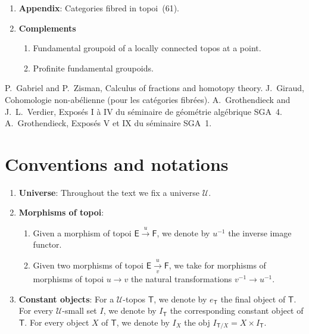 \documentclass[10pt,oneside]{amsart}
\newcommand{\oldpage}[1]{\marginnote{\textbf{#1}}}
\newcommand{\cal}{\mathcal}
\newcommand{\cat}{\mathsf}
\begin{document}
\begin{enumerate}[label=\arabic*.]
    I removed it in the corollary of Proposition~4.6.2, which directly describes the locally constant objects of the inductive limit.
    The advantage of the form (4.5) is to allow explicit calculations, which are developed in the points 4.6.3 and 4.6.7.
  \item[A.] \textbf{Appendix}: Categories fibred in topoi~(61).
  \item \textbf{Complements}
    \begin{enumerate}[label=5.\arabic*.]
      \item Fundamental groupoid of a locally connected topos at a point.
      \item Profinite fundamental groupoids.
    \end{enumerate}
\end{enumerate}

\begin{thebibliography}{4}
   P.~Gabriel and P.~Zisman, {Calculus of fractions and homotopy theory}.
   J.~Giraud, {Cohomologie non-ab\'elienne (pour les cat\'egories fibr\'ees)}.
   A.~Grothendieck and J.~L.~Verdier, {Expos\'es I \`a IV du s\'eminaire de g\'eom\'etrie alg\'ebrique SGA~4}.
   A.~Grothendieck, {Expos\'es V et IX du s\'eminaire SGA~1}.
\end{thebibliography}

\section*{Conventions and notations}
\oldpage{III}
\begin{enumerate}[label=(\arabic*)]
  \item \textbf{Universe}: Throughout the text we fix a universe $\cal{U}$.
  \item \textbf{Morphisms of topoi}:
    \begin{enumerate}[label=(\alph*)]
      \item Given a morphism of topoi $\cat{E}\xrightarrow{u}\cat{F}$, we denote by $u^{-1}$ the inverse image functor.
      \item Given two morphisms of topoi $\cat{E}\xrightarrow[v]{u}\cat{F}$, we take for morphisms of morphisms of topoi $u\to v$ the natural transformations $v^{-1}\to u^{-1}$.
    \end{enumerate}
  \item \textbf{Constant objects}: For a $\cal{U}$-topos $\cat{T}$, we denote by $e_\cat{T}$ the final object of $\cat{T}$.
    For every $\cal{U}$-small set $I$, we denote by $I_\cat{T}$ the corresponding constant object of $\cat{T}$.
    For every object $X$ of $\cat{T}$, we denote by $I_X$ the obj $I_{\cat{T}/X}=X\times I_\cat{T}$.
\end{enumerate}
\end{document}
